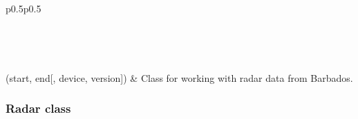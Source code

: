 \documentclass[letterpaper,10pt,english]{sphinxmanual}
\begin{document}
\begin{savenotes}\sphinxatlongtablestart\begin{longtable}{p{0.5\linewidth}p{0.5\linewidth}}
\hline

\endfirsthead

%
{}\\
\hline

\endhead

\hline
{}\\
\endfoot

\endlastfoot

{\hyperref[\detokenize{generated/MPPy.Instruments.Radar.Radar:MPPy.Instruments.Radar.Radar}]{}}(start, end{[}, device, version{]})
&
Class for working with radar data from Barbados.
\\
\hline
\end{longtable}\sphinxatlongtableend\end{savenotes}


\subsubsection{Radar class}
\label{\detokenize{generated/MPPy.Instruments.Radar.Radar::doc}}\label{\detokenize{generated/MPPy.Instruments.Radar.Radar:radar-class}}
\end{document}
